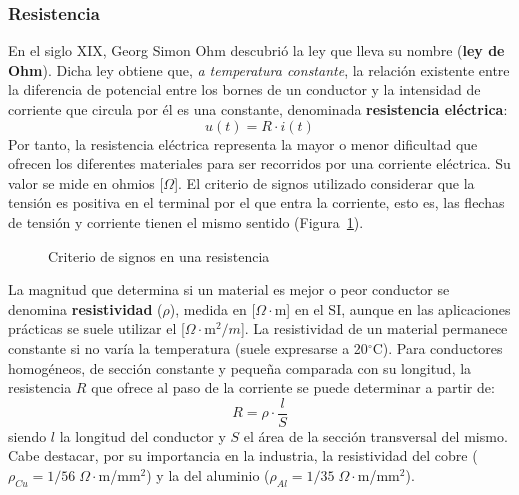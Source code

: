 \documentclass[11pt]{book} %
\begin{document}
	\subsubsection{Resistencia}
	En el siglo XIX, Georg Simon Ohm descubrió la ley que lleva su nombre (\textbf{ley de Ohm}). Dicha ley obtiene que, \textit{a temperatura constante}, la relación existente entre la diferencia de potencial entre los bornes de un conductor y la intensidad de corriente que circula por él es una constante, denominada \textbf{resistencia eléctrica}:
	\begin{equation*}
		\boxed{u(t)=R\cdot i(t)}
	\end{equation*}
	Por tanto, la resistencia eléctrica representa la mayor o menor dificultad que ofrecen los diferentes materiales para ser recorridos por una corriente eléctrica. Su valor se mide en ohmios [$\Omega$]. El criterio de signos utilizado considerar que la tensión es positiva en el terminal por el que entra la corriente, esto es, las flechas de tensión y corriente tienen el mismo sentido (Figura~\ref{fig.resistencia}).
	\begin{figure}[htbp]
		\centering
		\hfil
		\caption{Criterio de signos en una resistencia}
		\label{fig.resistencia}
	\end{figure}
	
	La magnitud que determina si un material es mejor o peor conductor se denomina \textbf{resistividad} ($\rho$), medida en [$\Omega\cdot$m] en el SI, aunque en las aplicaciones prácticas se suele utilizar el [$\Omega\cdot$m$^2/m$]. La resistividad de un material permanece constante si no varía la temperatura (suele expresarse a 20$^\circ$C). Para conductores homogéneos, de sección constante y pequeña comparada con su longitud, la resistencia $R$ que ofrece al paso de la corriente se puede determinar a partir de: 
	\begin{equation*}\label{eq.resistencia_rho}
		R=\rho\cdot \dfrac{l}{S}
	\end{equation*}
	siendo $l$ la longitud del conductor y $S$ el área de la sección transversal del mismo. Cabe destacar, por su importancia en la industria, la resistividad del cobre ($\rho_{Cu}=1/56\;\Omega \cdot$m/mm$^2$) y la del aluminio ($\rho_{Al}=1/35\;\Omega \cdot$m/mm$^2$).
	
\end{document}
